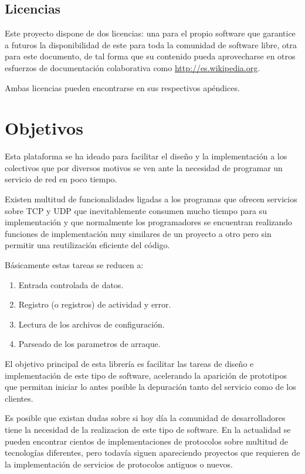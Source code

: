 \documentclass[a4paper,spanish,12pt]{book}
\begin{document}
\section{Licencias}
Este proyecto dispone de dos licencias: una para el propio software que garantice a futuros la disponibilidad de este para toda la comunidad de software libre, otra para este documento, de tal forma que su contenido pueda aprovecharse en otros esfuerzos de documentación colaborativa como \url{http://es.wikipedia.org}.

Ambas licencias pueden encontrarse en sus respectivos ap\'endices.
\chapter{Objetivos}

Esta plataforma se ha ideado para facilitar el diseño y la implementación a los colectivos que por diversos motivos se ven ante la necesidad de programar un servicio de red en poco tiempo. 

Existen multitud de funcionalidades ligadas a los programas que ofrecen servicios sobre TCP y UDP que inevitablemente consumen mucho tiempo para su implementación y que normalmente los programadores se encuentran realizando funciones de implementación muy similares de un proyecto a otro pero sin permitir una reutilización eficiente del código.

Básicamente estas tareas se reducen a:
\begin{enumerate}
	\item Entrada controlada de datos.
	\item Registro (o registros) de actividad y error.
	\item Lectura de los archivos de configuraci\'on.
	\item Parseado de los parametros de arraque.
\end{enumerate}

El objetivo principal de esta librería es facilitar las tareas de diseño e implementación de este tipo de software, acelerando la aparición de prototipos que permitan iniciar lo antes posible la depuración tanto del servicio como de los clientes.

Es posible que existan dudas sobre si hoy día la comunidad de desarrolladores tiene la necesidad de la realizacion de este tipo de software. En la actualidad se pueden encontrar cientos de implementaciones de protocolos sobre multitud de tecnologías diferentes, pero todavía siguen apareciendo proyectos que requieren de la implementación de servicios de protocolos antiguos o nuevos.
\end{document}
